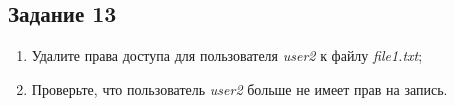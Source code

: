 \documentclass[12pt, a4paper]{report}
\begin{document}
	\subsection*{Задание 13}
	\begin{enumerate}
		\item Удалите права доступа для пользователя \textit{user2} к файлу \textit{file1.txt};
		\item Проверьте, что пользователь \textit{user2} больше не имеет прав на запись.
	\end{enumerate}
	\lstset{style=mystyle}
	
\end{document}

